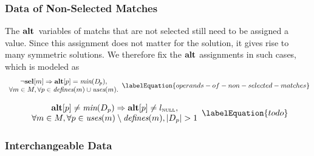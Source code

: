 \subsubsection{Data of Non-Selected Matches}

The $\mVar{alt}$~\glspl{variable} of \glspl{match} that are not selected still
need to be assigned a value.
%
Since this assignment does not matter for the \gls{solution}, it gives rise to
many symmetric \glspl{solution}.
%
We therefore fix the $\mVar{alt}$ assignments in such cases, which is modeled as
%
\begin{equation}
  \begin{array}{c}
    \neg\mVar{sel}[m] \mImp \mVar{alt}[p] = \mMin(\mDataSet[\hspace{-1pt}p]), \\
    \forall m \in \mMatchSet,
    \forall p \in \mDefines(m) \cup \mUses(m).
  \end{array}
  \labelEquation{operands-of-non-selected-matches}
\end{equation}



\begin{equation}
  \begin{array}{c}
    \mVar{alt}[p] \neq \mMin(\mDataSet[p])
    \mImp
    \mVar{alt}[p] \neq \mNullLocation, \\
    \forall m \in \mMatchSet,
    \forall p \in \mUses(m) \setminus \mDefines(m),
    \mCard{\mDataSet[p]} > 1
  \end{array}
  \labelEquation{todo}
\end{equation}


\subsubsection{Interchangeable Data}

